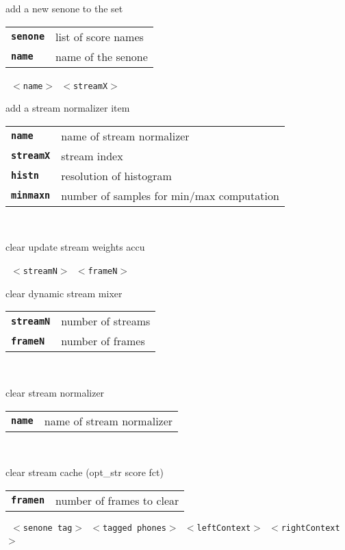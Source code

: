 \begin{description}
\begin{description}
        add a new senone to the set

      \begin{tabular}{ll}
 \texttt{\textbf{senone}} &  list of score names \\
 \texttt{\textbf{name}} &     name of the senone  \\
      \end{tabular}
       \texttt{ $<$name$>$ $<$streamX$>$  } \

        add a stream normalizer item

      \begin{tabular}{ll}
 \texttt{\textbf{name}} &     name of stream normalizer  \\
 \texttt{\textbf{streamX}} &  stream index  \\
 \texttt{\textbf{histn}} &     resolution of histogram  \\
 \texttt{\textbf{minmaxn}} &   number of samples for min/max computation  \\
      \end{tabular}
       \texttt{} \

        clear update stream weights accu

       \texttt{ $<$streamN$>$ $<$frameN$>$} \

        clear dynamic stream mixer

      \begin{tabular}{ll}
 \texttt{\textbf{streamN}} &  number of streams  \\
 \texttt{\textbf{frameN}} &   number of frames  \\
      \end{tabular}
       \texttt{ } \

        clear stream normalizer

      \begin{tabular}{ll}
 \texttt{\textbf{name}} &  name of stream normalizer  \\
      \end{tabular}
       \texttt{ } \

        clear stream cache (opt\_str score fct)

      \begin{tabular}{ll}
 \texttt{\textbf{framen}} &  number of frames to clear  \\
      \end{tabular}
       \texttt{ $<$senone tag$>$ $<$tagged phones$>$ $<$leftContext$>$ $<$rightContext$>$} \


\end{description}
\end{description}
